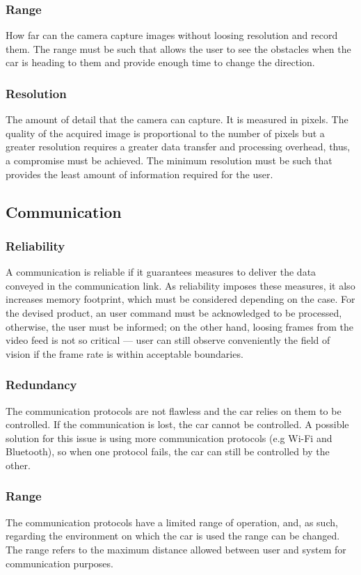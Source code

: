 \subsubsection{Range}%
\label{sec:orgecb044c}
How far can the camera capture images without loosing resolution and record them. The range must be such that allows the user to see the obstacles when the car is heading to them and provide enough time to change the direction.
\subsubsection{Resolution}%
\label{sec:orgba87554}%
The amount of detail that the camera can capture. It is measured in pixels. The quality of the acquired image is proportional to the number of pixels but a greater resolution requires a greater data transfer and processing overhead, thus, a compromise must be achieved. The minimum resolution must be such that provides the least amount of information required for the user. 
\subsection{Communication}%
\label{sec:org4241610}
\subsubsection{Reliability}%
\label{sec:orgdcb920d}
A communication is reliable if it guarantees measures to deliver the data
conveyed in the communication link. As reliability imposes these measures, it
also increases memory footprint, which must be considered
depending on the case. For the devised product, an user command
must be acknowledged to be processed, otherwise, the user must be informed; on
the other hand, loosing frames from the video feed is not so critical — user can
still observe conveniently the ﬁeld of vision if the frame rate is within
acceptable boundaries.
\subsubsection{Redundancy}
\label{sec:orgc5933fc}
The communication protocols are not flawless and the car relies on them to be controlled. If the communication is lost, the car cannot be controlled. A possible solution for this issue is using more communication protocols (e.g Wi-Fi and Bluetooth), so when one protocol fails, the car can still be controlled by the other.
\subsubsection{Range}%
\label{sec:org447a205}
The communication protocols have a limited range of operation, and, as such, regarding the environment on which the car is used the range can be changed.
The range refers to the maximum distance allowed between user and system for communication purposes.
